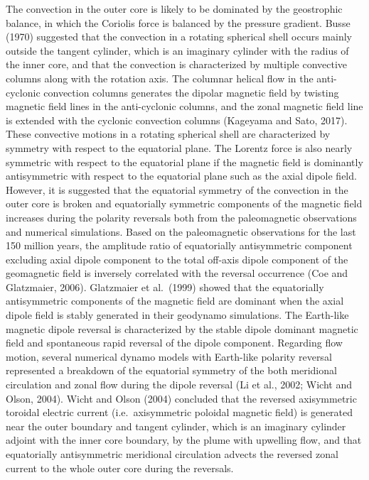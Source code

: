 The convection in the outer core is likely to be dominated by the geostrophic balance, in which the Coriolis force is balanced by the pressure gradient.
Busse (1970) 
suggested that the convection in a rotating spherical shell occurs mainly outside the tangent cylinder, which is an imaginary cylinder with the radius of the inner core, and that the convection is characterized by multiple convective columns along with the rotation axis. 
The columnar helical flow in the anti-cyclonic convection columns generates the dipolar magnetic field by twisting magnetic field lines in the anti-cyclonic columns, and the zonal magnetic field line is extended with the cyclonic convection columns (Kageyama and Sato, 2017). %
These convective motions in a rotating spherical shell are characterized by symmetry with respect to the equatorial plane.
The Lorentz force is also nearly symmetric with respect to the equatorial plane if the magnetic field is dominantly antisymmetric with respect to the equatorial plane such as the axial dipole field.
However, it is suggested that the equatorial symmetry of the convection in the outer core is broken and equatorially symmetric components of the magnetic field increases during the polarity reversals both from the paleomagnetic observations and numerical simulations.
Based on the paleomagnetic observations for the last 150 million years, the amplitude ratio of equatorially antisymmetric component excluding axial dipole component to the total off-axis dipole component of the geomagnetic field is inversely correlated with the reversal occurrence (Coe and Glatzmaier, 2006). %
Glatzmaier et al.\ (1999) %
showed that the equatorially antisymmetric components of the magnetic field are dominant when the axial dipole field is stably generated in their geodynamo simulations. 
The Earth-like magnetic dipole reversal is characterized by the stable dipole dominant magnetic field and spontaneous rapid reversal of the dipole component. 
Regarding flow motion, several numerical dynamo models with Earth-like polarity reversal represented a breakdown of the equatorial symmetry of the both meridional circulation and zonal flow  during the dipole reversal (Li et al., 2002; %
Wicht and Olson, 2004). %
Wicht and Olson (2004) concluded that the reversed axisymmetric toroidal electric current (i.e.\ axisymmetric poloidal magnetic field) is generated near the outer boundary and tangent cylinder, which is an imaginary cylinder adjoint with the inner core boundary, by the plume with upwelling flow, and that equatorially antisymmetric meridional circulation advects the reversed zonal current to the whole outer core during the reversals.

